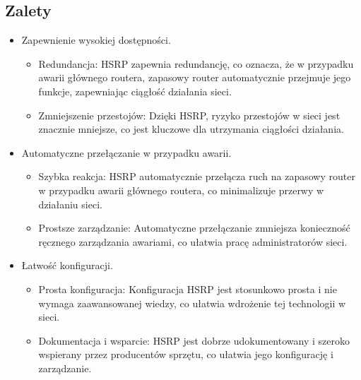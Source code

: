 \subsection{Zalety}
\begin{itemize}
    \item Zapewnienie wysokiej dostępności.
    \begin{itemize}
        \item Redundancja: HSRP zapewnia redundancję, co oznacza, że w przypadku awarii głównego routera, zapasowy router automatycznie przejmuje jego funkcje, zapewniając ciągłość działania sieci.
        \item Zmniejszenie przestojów: Dzięki HSRP, ryzyko przestojów w sieci jest znacznie mniejsze, co jest kluczowe dla utrzymania ciągłości działania.
    \end{itemize}
    \item Automatyczne przełączanie w przypadku awarii.
    \begin{itemize}
        \item Szybka reakcja: HSRP automatycznie przełącza ruch na zapasowy router w przypadku awarii głównego routera, co minimalizuje przerwy w działaniu sieci.
        \item Prostsze zarządzanie: Automatyczne przełączanie zmniejsza konieczność ręcznego zarządzania awariami, co ułatwia pracę administratorów sieci.
    \end{itemize}
    \item Łatwość konfiguracji.
    \begin{itemize}
        \item Prosta konfiguracja: Konfiguracja HSRP jest stosunkowo prosta i nie wymaga zaawansowanej wiedzy, co ułatwia wdrożenie tej technologii w sieci.
        \item Dokumentacja i wsparcie: HSRP jest dobrze udokumentowany i szeroko wspierany przez producentów sprzętu, co ułatwia jego konfigurację i zarządzanie.
    \end{itemize}
\end{itemize}

